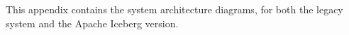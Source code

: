 This appendix contains the system architecture diagrams, for both the legacy system and the Apache Iceberg version.